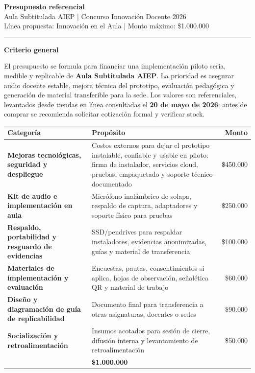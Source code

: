 \documentclass[10pt,letterpaper]{article}
\newcommand{\sectiontitle}[1]{%
  \vspace{0.55em}%
  {\bfseries\large #1}\par
  \vspace{0.12em}%
}
\newcommand{\money}[1]{\$#1}
\begin{document}
{\LARGE\bfseries Presupuesto referencial}\\[-0.15em]
{\normalsize Aula Subtitulada AIEP | Concurso Innovación Docente 2026}\\[-0.1em]
{\small Línea propuesta: Innovación en el Aula | Monto máximo: \money{1.000.000}}

\vspace{0.35em}
{\color{RuleGray}\rule{\textwidth}{0.6pt}}

\sectiontitle{Criterio general}

El presupuesto se formula para financiar una implementación piloto seria, medible y replicable de \textbf{Aula Subtitulada AIEP}. La prioridad es asegurar audio docente estable, mejora técnica del prototipo, evaluación pedagógica y generación de material transferible para la sede. Los valores son referenciales, levantados desde tiendas en línea consultadas el \textbf{20 de mayo de 2026}; antes de comprar se recomienda solicitar cotización formal y verificar stock.

\begin{center}
\begin{tabularx}{\textwidth}{>{\bfseries}p{4.1cm}Y R}
\toprule
Categoría & Propósito & Monto \\
\midrule
Mejoras tecnológicas, seguridad y despliegue & Costos externos para dejar el prototipo instalable, confiable y usable en piloto: firma de instalador, servicios cloud, pruebas, empaquetado y soporte técnico documentado & \money{450.000} \\
Kit de audio e implementación en aula & Micrófono inalámbrico de solapa, respaldo de captura, adaptadores y soporte físico para pruebas & \money{250.000} \\
Respaldo, portabilidad y resguardo de evidencias & SSD/pendrives para respaldar instaladores, evidencias anonimizadas, guías y material de transferencia & \money{100.000} \\
Materiales de implementación y evaluación & Encuestas, pautas, consentimientos si aplica, hojas de observación, señalética QR y material de trabajo & \money{60.000} \\
Diseño y diagramación de guía de replicabilidad & Documento final para transferencia a otras asignaturas, docentes o sedes & \money{90.000} \\
Socialización y retroalimentación & Insumos acotados para sesión de cierre, difusión interna y levantamiento de retroalimentación & \money{50.000} \\
\midrule
{} & \bfseries \money{1.000.000} \\
\bottomrule
\end{tabularx}
\end{center}
\end{document}
